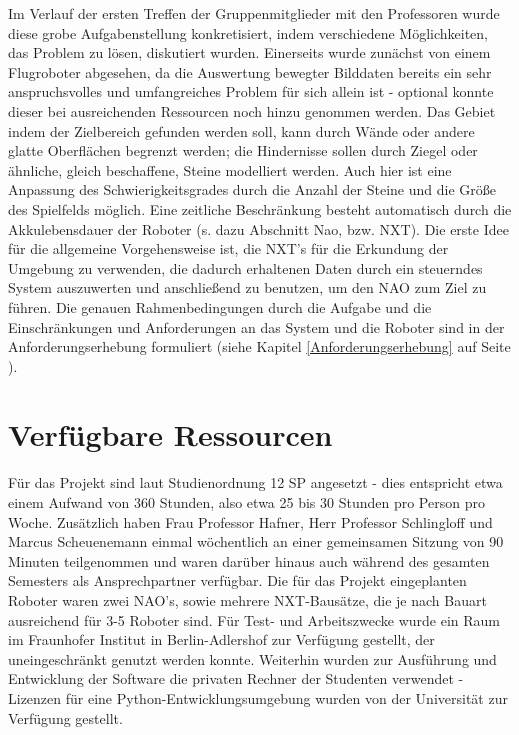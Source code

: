 Im Verlauf der ersten Treffen der Gruppenmitglieder mit den Professoren wurde diese grobe Aufgabenstellung konkretisiert, indem verschiedene Möglichkeiten, das Problem zu lösen, diskutiert wurden. Einerseits wurde zunächst von einem Flugroboter abgesehen, da die Auswertung bewegter Bilddaten bereits ein sehr anspruchsvolles und umfangreiches Problem für sich allein ist - optional konnte dieser bei ausreichenden Ressourcen noch hinzu genommen werden. Das Gebiet indem der Zielbereich gefunden werden soll, kann durch Wände oder andere glatte Oberflächen begrenzt werden; die Hindernisse sollen durch Ziegel oder ähnliche, gleich beschaffene, Steine modelliert werden. Auch hier ist eine Anpassung des Schwierigkeitsgrades durch die Anzahl der Steine und die Größe des Spielfelds möglich. Eine zeitliche Beschränkung besteht automatisch durch die Akkulebensdauer der Roboter (s. dazu Abschnitt Nao, bzw. NXT). Die erste Idee für die allgemeine Vorgehensweise ist, die NXT's für die Erkundung der Umgebung zu verwenden, die dadurch erhaltenen Daten durch ein steuerndes System auszuwerten und anschließend zu benutzen, um den NAO zum Ziel zu führen. Die genauen Rahmenbedingungen durch die Aufgabe und die Einschränkungen und Anforderungen an das System und die Roboter sind in der Anforderungserhebung formuliert (siehe Kapitel \ref{Anforderungserhebung} auf Seite \pageref{Anforderungserhebung}).


\section{Verfügbare Ressourcen}

Für das Projekt sind laut Studienordnung 12 SP angesetzt - dies entspricht etwa einem Aufwand von 360 Stunden, also etwa 25 bis 30 Stunden pro Person pro Woche. Zusätzlich haben Frau Professor Hafner, Herr Professor Schlingloff und Marcus Scheuenemann einmal wöchentlich an einer gemeinsamen Sitzung von 90 Minuten teilgenommen und waren darüber hinaus auch während des gesamten Semesters als Ansprechpartner verfügbar.
Die für das Projekt eingeplanten Roboter waren zwei NAO's, sowie mehrere NXT-Bausätze, die je nach Bauart ausreichend für 3-5 Roboter sind.
Für Test- und Arbeitszwecke wurde ein Raum im Fraunhofer Institut in Berlin-Adlershof zur Verfügung gestellt, der uneingeschränkt genutzt werden konnte.
Weiterhin wurden zur Ausführung und Entwicklung der Software die privaten Rechner der Studenten verwendet - Lizenzen für eine Python-Entwicklungsumgebung wurden von der Universität zur Verfügung gestellt.
